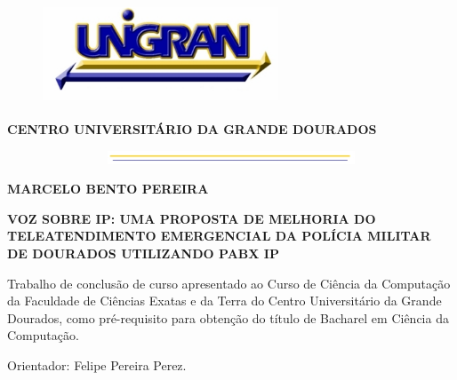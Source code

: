 \begin{center}   %

\begin{figure}[h] %
\centering        %
\includegraphics[width=7.0cm, height=3.0cm]{imagens/UNIGRAN.jpg} %
\end{figure}      %

\textbf{CENTRO UNIVERSITÁRIO DA GRANDE DOURADOS}

\begin{figure}[h]
\centering
\includegraphics[width=15.0cm, height=0.40cm]{imagens/AMARELO.jpg}
\end{figure}


\textbf{MARCELO BENTO PEREIRA}  \\ 

\vspace{4cm}

\textbf{VOZ SOBRE IP: UMA PROPOSTA DE MELHORIA DO TELEATENDIMENTO EMERGENCIAL DA POLÍCIA MILITAR DE DOURADOS UTILIZANDO PABX IP}  %

\vspace{2cm}

\begin{flushright}  %
\parbox[c]{.5\linewidth}{
            Trabalho de conclusão de curso apresentado ao Curso de Ciência da Computação da Faculdade de Ciências Exatas e da Terra do Centro Universitário da Grande Dourados, como pré-requisito para obtenção do título de Bacharel em Ciência da Computação.
            \vspace{1cm}

            Orientador: Felipe Pereira Perez.
         }
\end{flushright}


\end{center}
